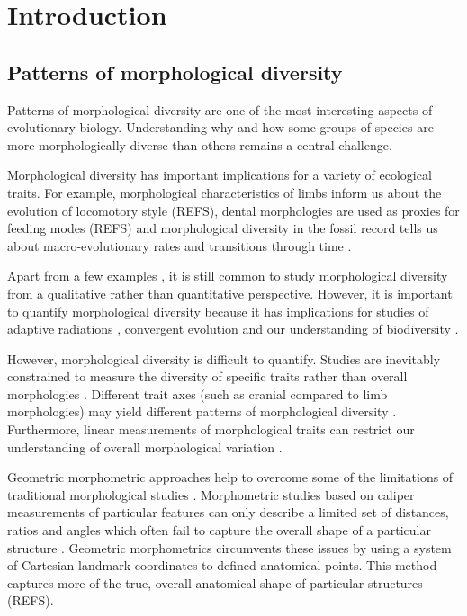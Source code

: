\chapter{Introduction}
\label{chap:introduction}


\noindent


\section{Patterns of morphological diversity}

	Patterns of morphological diversity are one of the most interesting aspects of evolutionary biology. Understanding why and how some groups of species are more morphologically diverse than others remains a central challenge. 
	
	Morphological diversity has important implications for a variety of ecological traits. For example, morphological characteristics of limbs inform us about the evolution of locomotory style (REFS), dental morphologies are used as proxies for feeding modes (REFS) and morphological diversity in the fossil record tells us about macro-evolutionary rates and transitions through time \citep{Brusatte2008}. 
	
	Apart from a few examples \citep[e.g.][]{Brusatte2008, Goswami2011, Ruta2013}, it is still common to study morphological diversity from a qualitative rather than quantitative perspective. However, it is important to quantify morphological diversity because it has implications for studies of adaptive radiations \citep{Losos2010}, convergent evolution \citep[e.g.][]{Muschick2012, Harmon2005} and our understanding of biodiversity \citep{Roy1997}.

	However, morphological diversity is difficult to quantify. Studies are inevitably constrained to measure the diversity of specific traits rather than overall morphologies \citep{Roy1997}. Different trait axes (such as cranial compared to limb morphologies) may yield different patterns of morphological diversity \citep{Foth2012}. Furthermore, linear measurements of morphological traits can restrict our understanding of overall morphological variation \citep{Rohlf1993}.
	
	Geometric morphometric approaches help to overcome some of the limitations of traditional morphological studies \citep{Adams2004}. Morphometric studies based on caliper measurements of particular features can only describe a limited set of distances, ratios and angles which often fail to capture the overall shape of a particular structure \citep{Slice2007}. Geometric morphometrics circumvents these issues by using a system of Cartesian landmark coordinates to defined anatomical points. This method captures more of the true, overall anatomical shape of particular structures (REFS).
	

